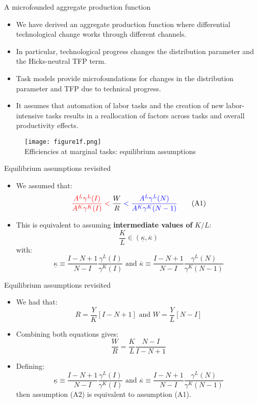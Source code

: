 \documentclass[notes=show]{beamer}
\begin{document}
\begin{frame}{A microfounded aggregate production function}
\begin{itemize}
\item We have derived an aggregate production function where differential technological change works through different channels.
\item In particular, technological progress changes the distribution parameter and the Hicks-neutral TFP term. \medskip
\item Task models provide microfoundations for changes in the distribution parameter and TFP due to technical progress. \medskip
\item It assumes that automation of labor tasks and the creation of new labor-intensive tasks results in a reallocation of factors across tasks and overall productivity effects. 
\end{itemize}
\end{frame}

\newpage
\begin{center}
\begin{figure}
\texttt{[image: figure1f.png]}
\\ Efficiencies at marginal tasks: equilibrium assumptions
\end{figure} 
\end{center}
\newpage

\begin{frame}{Equilibrium assumptions revisited}
\begin{itemize}
\item We assumed that:
\[
\color{red} \frac{A^{L}\gamma^{L}(I)}{A^{K}\gamma^{K}(I)} < \color{black} \frac{W}{R} \color{blue} < \frac{A^{L}\gamma^{L}(N)}{A^{K}\gamma^{K}(N-1)} \color{black} \tag{A1}
\]
\item This is equivalent to assuming \textbf{intermediate values of} $K/L$:
\[
\frac{K}{L} \in (\underline{\kappa}, \overline{\kappa}) \tag{A2} \label{eqA2}
\]
with:
\[
\underline{\kappa} \equiv \frac{I-N+1}{N-I}\frac{\gamma^{L}(I)}{\gamma^{K}(I)} \text{ and } \overline{\kappa} \equiv \frac{I-N+1}{N-I}\frac{\gamma^{L}(N)}{\gamma^{K}(N-1)}
\]
\end{itemize}
\end{frame}

\begin{frame}{Equilibrium assumptions revisited}
\begin{itemize}
\item We had that:
\[
R = \frac{Y}{K}[I-N+1] \text{ and }  W = \frac{Y}{L}[N-I] \tag{5}
\]
\item Combining both equations gives:
\[
\frac{W}{R} = \frac{K}{L} \frac{N-I}{I-N+1}
\]
\item Defining:
\[
\underline{\kappa} \equiv \frac{I-N+1}{N-I}\frac{\gamma^{L}(I)}{\gamma^{K}(I)} \text{ and } \overline{\kappa} \equiv \frac{I-N+1}{N-I}\frac{\gamma^{L}(N)}{\gamma^{K}(N-1)}
\]
then assumption (A2) is equivalent to assumption (A1).
\end{itemize}
\end{frame}
\end{document}
